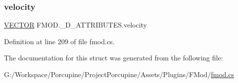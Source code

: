\subsubsection{\texorpdfstring{velocity}{velocity}}
{\footnotesize\ttfamily \hyperlink{struct_f_m_o_d_1_1_v_e_c_t_o_r}{V\+E\+C\+T\+OR} F\+M\+O\+D.\+\_\+D\+\_\+\+A\+T\+T\+R\+I\+B\+U\+T\+E\+S.\+velocity}



Definition at line 209 of file fmod.\+cs.



The documentation for this struct was generated from the following file\+:\begin{DoxyCompactItemize}
\item 
G\+:/\+Workspace/\+Porcupine/\+Project\+Porcupine/\+Assets/\+Plugins/\+F\+Mod/\hyperlink{fmod_8cs}{fmod.\+cs}\end{DoxyCompactItemize}
